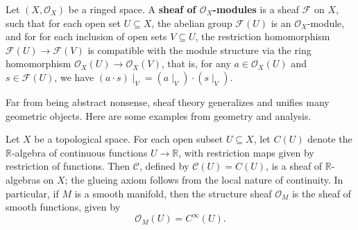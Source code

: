 \documentclass[11pt]{article}
\begin{document}
\begin{definition}
    Let $ (X,\mathscr{O}_{X}) $ be a ringed space. 
    A \textbf{sheaf of $ \mathscr{O}_{X} $-modules } is a sheaf 
    $ \mathscr{F} $ on $ X $, such that for each open set $ U \subseteq X $, 
    the abelian group $ \mathscr{F}(U) $ is an $ \mathscr{O}_{X} $-module, 
    and for for each inclusion of open sets $ V \subseteq U $, 
    the restriction homomorphism $ \mathscr{F}(U) \to \mathscr{F}(V) $ 
    is compatible with the module structure via the ring homomorphism 
    $ \mathscr{O}_{X}(U) \to \mathscr{O}_X(V) $, that is, 
    for any $ a \in \mathscr{O}_{X}(U) $ and $ s \in \mathscr{F}(U) $, 
    we have $ (a \cdot s)\mid_{V} = (a\mid_{V}) \cdot (s \mid_{V}) $. 
\end{definition}

Far from being abstract nonsense, 
sheaf theory generalizes and unifies many geometric objects. 
Here are some examples from geometry and analysis. 

\begin{example}
Let \(X\) be a topological space. For each open subset \(U\subseteq X\), 
let \(C(U)\) denote the \(\mathbb{R}\)-algebra of continuous functions 
\(U\to \mathbb{R}\), with restriction maps given by restriction of functions. 
Then \(\mathscr{C}\), defined by \(\mathscr{C}(U)=C(U)\), is a sheaf of 
\(\mathbb{R}\)-algebras on \(X\); the glueing axiom follows from the local 
nature of continuity. In particular, if \(M\) is a smooth manifold, then the 
structure sheaf \(\mathscr{O}_{M}\) is the sheaf of smooth functions, given by
\[
\mathscr{O}_{M}(U)=C^{\infty}(U).
\]
\end{example}
\end{document}
